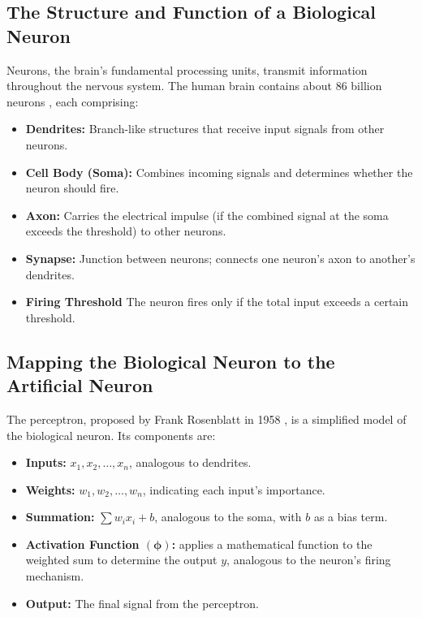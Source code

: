 \documentclass[9pt]{extarticle}
\theoremstyle{plain}
\theoremstyle{definition}
\theoremstyle{remark}
\begin{document}
\subsection{The Structure and Function of a Biological Neuron}
Neurons, the brain’s fundamental processing units, transmit information
throughout the nervous system. The human brain contains about 86 billion
neurons \cite{harvard_brain}, each comprising:
\begin{itemize}
    \item \textbf{Dendrites:} Branch-like structures that receive input signals from other neurons.
    \item \textbf{Cell Body (Soma):} Combines incoming signals and determines whether the neuron should fire.
    \item \textbf{Axon:} Carries the electrical impulse (if the combined signal at the soma exceeds the threshold) to other neurons.
    \item \textbf{Synapse:} Junction between neurons; connects one neuron's axon to another's dendrites.
    \item \textbf{Firing Threshold} The neuron fires only if the total input exceeds a certain threshold.
\end{itemize}
\subsection{Mapping the Biological Neuron to the Artificial Neuron}
The perceptron, proposed by Frank Rosenblatt in 1958 \cite{rosenblatt_perceptron}, is a simplified model of the biological neuron. Its components are:
\begin{itemize}
    \item \textbf{Inputs:} $x_1, x_2, \ldots, x_n$, analogous to dendrites.
    \item \textbf{Weights:} $w_1, w_2, \ldots, w_n$, indicating each input's importance.
    \item \textbf{Summation:} $\sum w_i x_i + b$, analogous to the soma, with $b$ as a bias term.
    \item \textbf{Activation Function $(\boldsymbol{\phi})$:} applies a mathematical function to the weighted sum to determine the output $y$, analogous to the neuron's firing mechanism.
    \item \textbf{Output:} The final signal from the perceptron.
\end{itemize}
\end{document}
